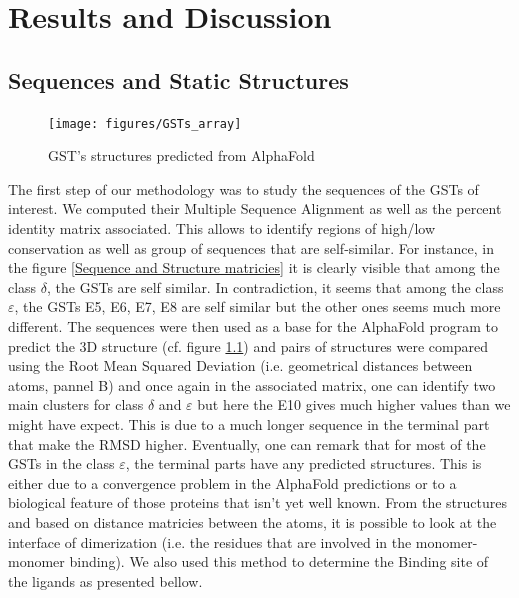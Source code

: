 \chapter{Results and Discussion}

\section{Sequences and Static Structures}

\begin{figure}[h!]
	\label{AlphaFold structures}
	\texttt{[image: figures/GSTs\_array]}
	\caption{GST's structures predicted from AlphaFold}
\end{figure}

\noindent The first step of our methodology was to study the sequences of the GSTs of interest. We computed their Multiple Sequence Alignment as well as the percent identity matrix associated. This allows to identify regions of high/low conservation as well as group of sequences that are self-similar. For instance, in the figure \ref{Sequence and Structure matricies} it is clearly visible that among the class $\delta$, the GSTs are self similar. In contradiction, it seems that among the class $\varepsilon$, the GSTs E5, E6, E7, E8 are self similar but the other ones seems much more different. The sequences were then used as a base for the AlphaFold program to predict the 3D structure (cf. figure \ref{AlphaFold structures}) and pairs of structures were compared using the Root Mean Squared Deviation (i.e. geometrical distances between atoms, pannel B) and once again in the associated matrix, one can identify two main clusters for class $\delta$ and $\varepsilon$ but here the E10 gives much higher values than we might have expect. This is due to a much longer sequence in the terminal part that make the RMSD higher. Eventually, one can remark that for most of the GSTs in the class $\varepsilon$, the terminal parts have any predicted structures. This is either due to a convergence problem in the AlphaFold predictions or to a biological feature of those proteins that isn't yet well known. From the structures and based on distance matricies between the atoms, it is possible to look at the interface of dimerization (i.e. the residues that are involved in the monomer-monomer binding). We also used this method to determine the Binding site of the ligands as presented bellow.

